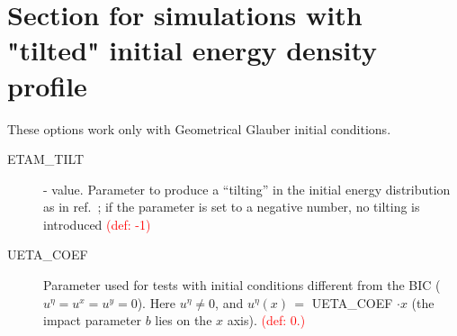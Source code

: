 \section{Section for simulations with "tilted" initial energy density profile}
These options work only with Geometrical Glauber initial conditions.
\begin{description}
 \item[ETAM\_TILT] \real - value. Parameter to produce a ``tilting'' in the initial energy distribution as in ref.~\cite{Becattini:2015ska}; if the parameter is set to a negative number, no tilting is introduced  \textcolor{red}{(def: -1)}
\item[UETA\_COEF] Parameter used for tests with initial conditions different from the BIC ($u^{\eta}=u^x=u^y=0$). Here  $u^{\eta}\ne 0$, and $u^{\eta}(x)\,=$ UETA\_COEF $\cdot x$ (the impact parameter $b$ lies on the $x$ axis).  \textcolor{red}{(def: 0.)}
\end{description}

